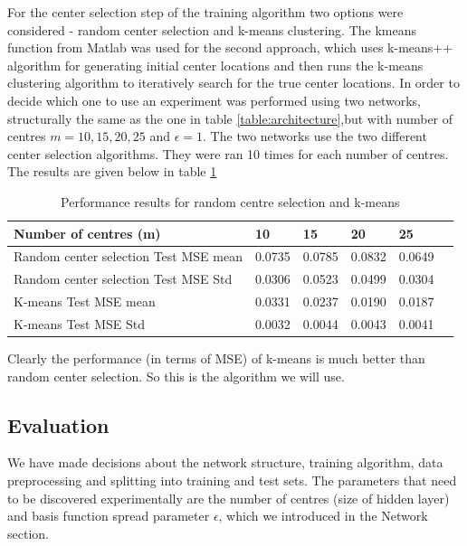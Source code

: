 \documentclass[a4paper, 11pt]{article}
\begin{document}
For the center selection step of the training algorithm two options were considered - random center selection and k-means clustering. The kmeans function from Matlab was used for the second approach, which uses k-means++ algorithm \cite{Arthur2007} for generating initial center locations and then runs the k-means clustering algorithm \cite{Lloyd82} to iteratively search for the true center locations. In order to decide which one to use an experiment was performed using two networks, structurally the same as the one in table \ref{table:architecture},but with number of centres $m = 10, 15, 20, 25$ and $\epsilon = 1$. The two networks use the two different center selection algorithms. They were ran 10 times for each number of centres. The results are given below in table \ref{table:centermse}

\begin{table}[h]
\centering
\begin{tabular}{| l | l | l | l | l | l |}
\hline
Number of centres (m) & 10 & 15 & 20 & 25 \\
\hline
Random center selection Test MSE mean & 0.0735 & 0.0785 & 0.0832 & 0.0649 \\
\hline
Random center selection Test MSE Std & 0.0306 & 0.0523 & 0.0499 & 0.0304 \\
\hline
K-means Test MSE mean & 0.0331 & 0.0237 & 0.0190 & 0.0187 \\
\hline
K-means Test MSE Std & 0.0032 & 0.0044 & 0.0043 & 0.0041 \\
\hline
\end{tabular}
\caption{Performance results for random centre selection and k-means}
\label{table:centermse}
\end{table}

Clearly the performance (in terms of MSE) of k-means is much better than random center selection. So this is the algorithm we will use.

\subsection{Evaluation}
We have made decisions about the network structure, training algorithm, data preprocessing and splitting into training and test sets. The parameters that need to be discovered experimentally are the number of centres (size of hidden layer) and basis function spread parameter $\epsilon$, which we introduced in the Network section.
\end{document}
